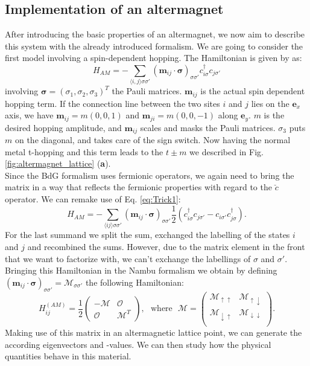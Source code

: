 \documentclass[../main.tex]{main.tex}
\begin{document}
\subsection{Implementation of an altermagnet}
After introducing the basic properties of an altermagnet, we now aim to describe this system with the already introduced formalism.
We are going to consider the first model involving a spin-dependent hopping. The Hamiltonian is given by \cite{Ouassou2023} as:
\begin{equation*}
    H_{AM} = -\sum_{\langle i, j\rangle\sigma\sigma'} \left(\bm{m}_{ij} \cdot \bm{\sigma}\right)_{\sigma\sigma'} c_{i\sigma}^{\dagger} c_{j\sigma'} 
\end{equation*}
involving $\bm{\sigma}=(\sigma_1, \sigma_2,\sigma_3)^T$ the Pauli matrices. $\bm{m}_{ij}$ is the actual spin dependent hopping term. If the connection line 
between the two sites $i$ and $j$ lies on the $\bm{e}_x$ axis, we have $\bm{m}_{ij} = m(0,0,1)$ and $\bm{m}_{ji} = m(0,0,-1)$ along $\bm{e}_y$. $m$ is 
the desired hopping amplitude, and $\bm{m}_{ij}$ scales and masks the Pauli matrices. $\sigma_3$ puts $m$ on the diagonal, and takes care of the sign switch. 
Now having the normal metal t-hopping and this term leads to the $t\pm m$ we
described in Fig. \ref{fig:altermagnet_lattice} (\textbf{a}).\\

Since the BdG formalism uses fermionic operators, we again need to bring the matrix in a way that reflects the fermionic properties with regard to the $\check{c}$ operator.
We can remake use of Eq. \ref{eq:Trick1}:
\begin{equation*}
    H_{AM} = -\sum_{\langle i j\rangle\sigma\sigma'} \left(\bm{m}_{ij} \cdot \bm{\sigma}\right)_{\sigma\sigma'} \frac{1}{2}\left(c_{i\sigma}^{\dagger} c_{j\sigma'} - c_{i\sigma'}c_{j\sigma}^{\dagger}\right).
\end{equation*}
For the last summand we split the sum, exchanged the labelling of the states $i$ and $j$ and recombined the sums. However, due to the matrix element in the front
that we want to factorize with, we can't exchange the labellings of $\sigma$ and $\sigma'$.
Bringing this Hamiltonian in the Nambu formalism we obtain by defining
$\left(\bm{m}_{ij} \cdot \bm{\sigma}\right)_{\sigma\sigma'} = \mathcal{M}_{\sigma\sigma'}$ 
the following Hamiltonian:
\begin{equation*}
    H^{(AM)}_{ij} = \frac{1}{2}\begin{pmatrix}
        -\mathcal{M} & \mathcal{O}\\
        \mathcal{O} & \mathcal{M}^T
    \end{pmatrix}
    ,~~~ \text{where} ~~~ \mathcal{M} = \begin{pmatrix}
        \mathcal{M}_{\uparrow\uparrow} & \mathcal{M}_{\uparrow\downarrow}\\
        \mathcal{M}_{\downarrow\uparrow} & \mathcal{M}_{\downarrow\downarrow}\\
    \end{pmatrix}.
\end{equation*}
Making use of this matrix in an altermagnetic lattice point, we can generate the according eigenvectors and -values. We can then study how the physical quantities 
behave in this material.\\
\end{document}
